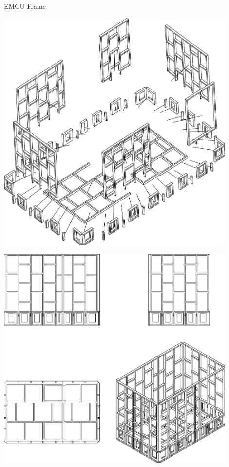 \documentclass{beamer}
\begin{document}
\begin{frame} {EMCU Frame}

    \begin{center}
        \vspace{0.5cm}
        \begin{minipage} {0.49\textwidth}
            \begin{center}
                \includegraphics[width = 0.9\textwidth]{frame_explode.pdf}
            \end{center}
        \end{minipage}
        \begin{minipage} {0.45\textwidth}
            \vspace{0.5cm}
            \begin{center}
                \includegraphics[width = 0.9\textwidth]{frame_views.pdf}
            \end{center}
        \end{minipage}
    \end{center}
\end{frame}
\end{document}
